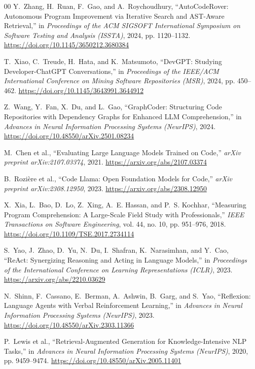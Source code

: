 \documentclass[conference]{IEEEtran}
\begin{document}
\begin{thebibliography}{00}
Y.~Zhang, H.~Ruan, F.~Gao, and A.~Roychoudhury, ``AutoCodeRover: Autonomous Program Improvement via Iterative Search and AST-Aware Retrieval,'' in \emph{Proceedings of the ACM SIGSOFT International Symposium on Software Testing and Analysis (ISSTA)}, 2024, pp. 1120--1132. \url{https://doi.org/10.1145/3650212.3680384}

T.~Xiao, C.~Treude, H.~Hata, and K.~Matsumoto, ``DevGPT: Studying Developer-ChatGPT Conversations,'' in \emph{Proceedings of the IEEE/ACM International Conference on Mining Software Repositories (MSR)}, 2024, pp. 450--462. \url{https://doi.org/10.1145/3643991.3644912}

Z.~Wang, Y.~Fan, X.~Du, and L.~Gao, ``GraphCoder: Structuring Code Repositories with Dependency Graphs for Enhanced LLM Comprehension,'' in \emph{Advances in Neural Information Processing Systems (NeurIPS)}, 2024. \url{https://doi.org/10.48550/arXiv.2501.08234}

M.~Chen et al., ``Evaluating Large Language Models Trained on Code,'' \emph{arXiv preprint arXiv:2107.03374}, 2021. \url{https://arxiv.org/abs/2107.03374}

B.~Rozi{\`e}re et al., ``Code Llama: Open Foundation Models for Code,'' \emph{arXiv preprint arXiv:2308.12950}, 2023. \url{https://arxiv.org/abs/2308.12950}

X.~Xia, L.~Bao, D.~Lo, Z.~Xing, A.~E. Hassan, and P.~S. Kochhar, ``Measuring Program Comprehension: A Large-Scale Field Study with Professionals,'' \emph{IEEE Transactions on Software Engineering}, vol. 44, no. 10, pp. 951--976, 2018. \url{https://doi.org/10.1109/TSE.2017.2734114}

S.~Yao, J.~Zhao, D.~Yu, N.~Du, I.~Shafran, K.~Narasimhan, and Y.~Cao, ``ReAct: Synergizing Reasoning and Acting in Language Models,'' in \emph{Proceedings of the International Conference on Learning Representations (ICLR)}, 2023. \url{https://arxiv.org/abs/2210.03629}

N.~Shinn, F.~Cassano, E.~Berman, A.~Ashwin, B.~Garg, and S.~Yao, ``Reflexion: Language Agents with Verbal Reinforcement Learning,'' in \emph{Advances in Neural Information Processing Systems (NeurIPS)}, 2023. \url{https://doi.org/10.48550/arXiv.2303.11366}

P.~Lewis et al., ``Retrieval-Augmented Generation for Knowledge-Intensive NLP Tasks,'' in \emph{Advances in Neural Information Processing Systems (NeurIPS)}, 2020, pp. 9459--9474. \url{https://doi.org/10.48550/arXiv.2005.11401}


\end{thebibliography}
\end{document}
